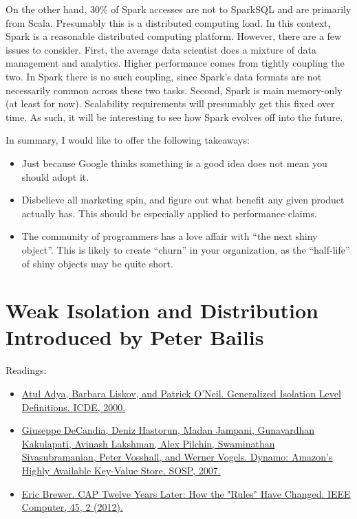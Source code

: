 \documentclass[b5paper,11pt,twoside,openright]{book}
\newcommand\Chapter[3]{
  \hypertarget{#1}{
    \chapter[#2]{#2\\{\Large #3}}\label{#1}
  }
}
\begin{document}
On the other hand, 30\% of Spark accesses are not to SparkSQL and are
primarily from Scala. Presumably this is a distributed computing load.
In this context, Spark is a reasonable distributed computing platform.
However, there are a few issues to consider. First, the average data
scientist does a mixture of data management and analytics. Higher
performance comes from tightly coupling the two. In Spark there is no
such coupling, since Spark's data formats are not necessarily common
across these two tasks. Second, Spark is main memory-only (at least for
now). Scalability requirements will presumably get this fixed over time.
As such, it will be interesting to see how Spark evolves off into the
future.

In summary, I would like to offer the following takeaways:

\begin{itemize}
  \item
  Just because Google thinks something is a good idea does not mean you
  should adopt it.
  \item
  Disbelieve all marketing spin, and figure out what benefit any given
  product actually has. This should be especially applied to performance
  claims.
  \item
  The community of programmers has a love affair with ``the next shiny
  object''. This is likely to create ``churn'' in your organization, as
  the ``half-life'' of shiny objects may be quite short.
\end{itemize}


\Chapter{ch6-isolation}{%
Weak Isolation and Distribution
}{%
Introduced by Peter Bailis
}

\begin{framed}
Readings:
\begin{itemize}
\item
\href{https://scholar.google.com/scholar?cluster=12975897967422539576}{Atul
  Adya, Barbara Liskov, and Patrick O'Neil. {Generalized Isolation Level
    Definitions}. {ICDE}, 2000.}
\item
\href{https://scholar.google.com/scholar?cluster=5432858092023181552}{Giuseppe
  DeCandia, Deniz Hastorun, Madan Jampani, Gunavardhan Kakulapati, Avinash
  Lakshman, Alex Pilchin, Swaminathan Sivasubramanian, Peter Vosshall, and
  Werner Vogels. {Dynamo: Amazon's Highly Available Key-Value Store}.
  {SOSP}, 2007.}
\item
\href{https://scholar.google.com/scholar?cluster=17642052422667212790}{Eric
  Brewer. {CAP Twelve Years Later: How the "Rules" Have Changed}. {IEEE
    Computer}, 45, 2 (2012).}
\end{itemize}
\end{framed}
\end{document}

